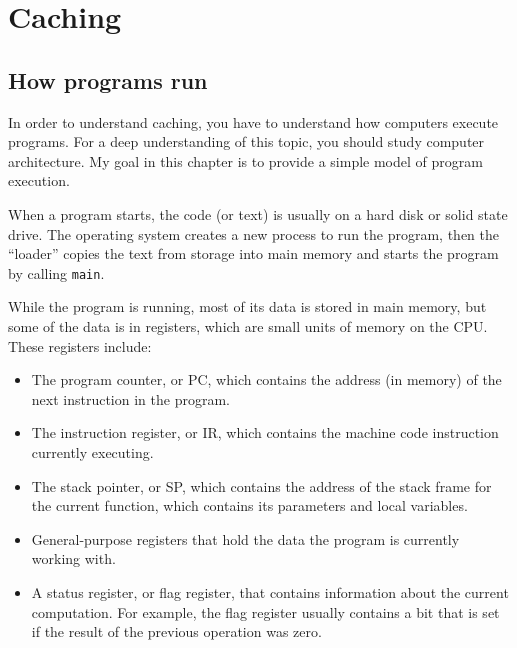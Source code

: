 \documentclass[12pt]{book}
\begin{document}
{\begin{itemize}
\end{itemize}


\chapter{Caching}


\section{How programs run}

In order to understand caching, you have to understand how computers
execute programs.  For a deep understanding of this topic, you should
study computer architecture.  My goal in this chapter is to provide
a simple model of program execution.

When a program starts, the code (or text) is usually on a hard disk
or solid state drive.  The operating system creates a new process to
run the program, then the ``loader''
copies the text from storage into main memory and starts the program by
calling {\tt main}.

While the program is running, most of its data is stored in main
memory, but some of the data is in registers, which are
small units of memory on the CPU.  These registers include:

\begin{itemize}

\item The program counter, or PC, which contains the address (in
  memory) of the next instruction in the program.

\item The instruction register, or IR, which contains the machine code
  instruction currently executing.

\item The stack pointer, or SP, which contains the address of the
  stack frame for the current function, which contains its parameters
  and local variables.

\item General-purpose registers that hold the data the program is
  currently working with.

\item A status register, or flag register, that contains information
  about the current computation.  For example, the flag register
  usually contains a bit that is set if the result of the previous
  operation was zero.


\end{itemize}}
\end{document}
